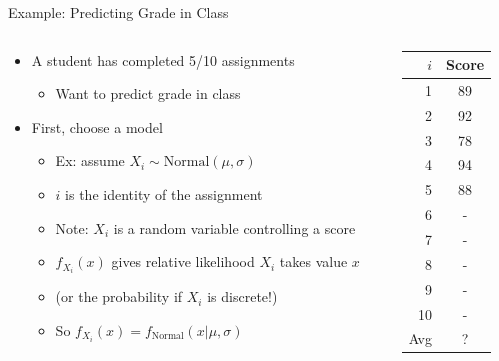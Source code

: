 \documentclass[aspectratio=169]{beamer}
\begin{document}
\begin{frame}{Example: Predicting Grade in Class}

\begin{columns}
\begin{column}{0.7\textwidth}
\begin{itemize}
	\item A student has completed 5/10 assignments
	\begin{itemize}
	\item Want to predict grade in class
	\end{itemize}
	\item First, choose a model
	\begin{itemize}
	\item Ex: assume $X_i \sim \textrm{Normal} (\mu, \sigma)$ 
	\item $i$ is the identity of the assignment
	\item Note: $X_i$ is a random variable controlling a score
	\item $f_{X_i} (x)$ gives relative likelihood $X_i$ takes value $x$
	\item (or the probability if $X_i$ is discrete!)
	\item So $f_{X_i} (x) = f_{\textrm{Normal}}(x | \mu, \sigma)$
	\end{itemize}
\end{itemize}
\end{column}
\begin{column}{0.3\textwidth}
\begin{tabular}{|r|c|} \hline
$i$ & Score \\ \hline
1 & 89 \\ \hline
2 & 92 \\ \hline
3 & 78 \\ \hline
4 & 94 \\ \hline
5 & 88 \\ \hline
6 & -  \\ \hline
7 &  - \\ \hline
8 &  - \\ \hline
9 &  - \\ \hline
10 & - \\ \hline \hline
Avg & ? \\ \hline
\end{tabular}
\end{column}
\end{columns}
\end{frame}
\end{document}
